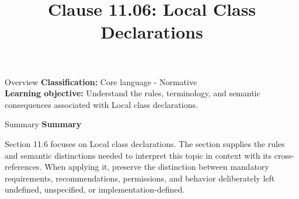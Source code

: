\documentclass[10pt,letterpaper]{article}
\title{Clause 11.06: Local Class Declarations}
\author{}
\date{}
\begin{document}
\maketitle
\begin{CornellOverviewBox}{Overview}
\textbf{Classification:} Core language - Normative\\[2pt]
\textbf{Learning objective:} Understand the rules, terminology, and semantic consequences associated with Local class declarations.
\end{CornellOverviewBox}\begin{CornellSummaryBox}{Summary}
{\sffamily\bfseries\color{Accent} Summary}\par\vspace{3pt}Section 11.6 focuses on Local class declarations. The section supplies the rules and semantic distinctions needed to interpret this topic in context with its cross-references. When applying it, preserve the distinction between mandatory requirements, recommendations, permissions, and behavior deliberately left undefined, unspecified, or implementation-defined.
\end{CornellSummaryBox}
\end{document}
